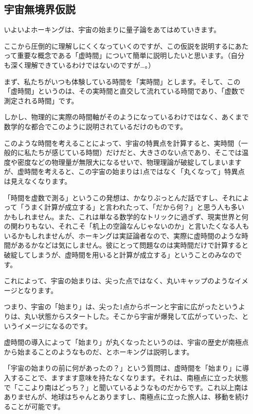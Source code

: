 \documentclass[10pt,b5paper,papersize,dvipdfmx]{jsbook}
\begin{document}
\subsection{宇宙無境界仮説}
いよいよホーキングは、宇宙の始まりに量子論をあてはめていきます。\par
ここから圧倒的に理解しにくくなっていくのですが、この仮説を説明するにあたって重要な概念である「虚時間」について簡単に説明したいと思います。（自分も深く理解できているわけではないのですが…。）\par
まず、私たちがいつも体験している時間を「実時間」とします。そして、この「虚時間」というのは、その実時間と直交して流れている時間であり、「虚数で測定される時間」です。\par
しかし、物理的に実際の時間軸がそのようになっているわけではなく、あくまで数学的な都合でこのように説明されているだけのものです。\par
このような時間を考えることによって、宇宙の特異点を計算すると、実時間（一般的に私たちが感じている時間）だけだと、大きさのない点であり、そこでは温度や密度などの物理量が無限大になるせいで、物理理論が破綻してしまいますが、虚時間を考えると、この宇宙の始まりは1点ではなく「丸くなって」特異点は見えなくなります。\par
「時間を虚数で測る」というこの発想は、かなりぶっとんだ話ですし、それによって「うまく計算が成立する」と言われたって、「だから何？」と思う人も多いかもしれません。また、これは単なる数学的なトリックに過ぎず、現実世界と何の関わりもない、それこそ「机上の空論なんじゃないのか」と言いたくなる人もいるかもしれませんが、ホーキングは実証論者なので、実際に虚時間のような時間があるかなどは気にしません。彼にとって問題なのは実時間だけで計算すると破綻してしまうが、虚時間を用いると計算が成立する」ということのみなのです。\par
これによって、宇宙の始まりは、尖った点ではなく、丸いキャップのようなイメージとなります。\par
つまり、宇宙の「始まり」は、尖った1点からボーンと宇宙に広がったというよりは、丸い状態からスタートした。そこから宇宙が爆発して広がっていった、というイメージになるのです。\par
虚時間の導入によって「始まり」が丸くなったというのは、宇宙の歴史が南極点から始まることのようなものだ、とホーキングは説明します。\par
「宇宙の始まりの前に何があったの？」という質問は、虚時間を「始まり」に導入することで、ますます意味を持たなくなります。それは、南極点に立った状態で「ここより南はどっち？」と聞いているようなものだからです。これ以上南はありませんが、地球はちゃんとありますし、南極点に立った旅人は、移動を続けることが可能です。\par
\end{document}

